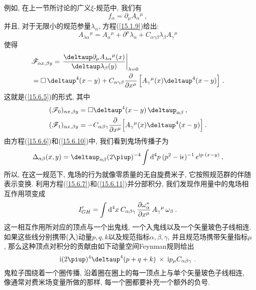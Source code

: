 例如, 在上一节所讨论的广义$\xi $-规范中, 我们有
\begin{equation}
f_{\alpha }=\partial _{\mu }A_{\alpha}{}^{\mu}\:,   \label{15.6.8}
\end{equation}%
并且, 对于无限小的规范参量$\lambda _{\alpha }$, 方程(\ref{15.1.9})给出:%
\[
A_{\lambda \alpha}{}^{\mu}=A_{\alpha}{}^{\mu}+\partial^{\mu }\lambda
_{\alpha }+C_{\alpha \gamma \beta }\lambda_{\beta}A_{\gamma}{}^{\mu}
\]%
使得\begin{align}
&\mathscr{F}_{\alpha x,\beta y} =\left. \frac{\deltaup \partial _{\mu
}A_{\lambda \alpha}{}^{\mu}(x)}{\deltaup \lambda _{\beta }(y)}\right\vert
_{\lambda =0}  \nonumber \\
&=\square \,\deltaup^{4}(x-y)+C_{\alpha \gamma \beta }\frac{\partial }{%
\partial x^{\mu }}\,\Big[ A_{\gamma}{}^{\mu}(x)\deltaup^{4}(x-y)\Big] \text{
.}  \label{15.6.9}
\end{align}
这就是(\ref{15.6.5})的形式, 其中\begin{align}
(\mathscr{F}_{0})_{\alpha x,\beta y} &=\square \deltaup^{4}(x-y)\,\deltaup
_{\alpha \beta }\:,   \label{15.6.10} \\
(\mathscr{F}_{1})_{\alpha x,\beta y} &=-C_{\alpha \beta \gamma }\frac{%
\partial }{\partial x^{\mu }}\Big[ A_{\gamma}{}^{\mu}(x)\deltaup^{4}(x-y)%
\Big] \:.   \label{15.6.11}
\end{align}%
由方程(\ref{15.6.6})和(\ref{15.6.10})中, 我们看到鬼场传播子为
\begin{equation}
\Delta _{\alpha \beta }(x,y)=\deltaup_{\alpha \beta }(2\uppi )^{-4}\int
\dif^{4}p\:(p^{2}-\mi\epsilon )^{-1}\,e^{\mi p\cdot (x-y)}\:,   \label{15.6.12}
\end{equation}%
所以, 在这一规范下, 鬼场的行为就像零质量的无自旋费米子, 它按照规范群的伴随表示变换. 
利用方程(\ref{15.6.7})和(\ref{15.6.11})并分部积分, 我们发现作用量中的鬼场相互作用项变成
\begin{equation}
I_{GH}^{\prime }=\int \dif^{4}x\:C_{\alpha \beta \gamma }\,\frac{\partial \omega
_{\alpha }^{\ast }}{\partial x^{\mu }}\,A_{\gamma}{}^{\mu }\,\omega _{\beta }%
\:.   \label{15.6.13}
\end{equation}%
这一相互作用所对应的顶点与一个出鬼线, 一个入鬼线以及一个矢量玻色子线相连. 如果这些线分别携带(入)动量$p,q,k$以及规范指标$\alpha ,\beta ,\gamma $, 并且规范场携带矢量指标$\mu $, 那么这种顶点对积分的贡献由如下动量空间Feynman规则给出
\begin{equation}
\mi(2\uppi )^{4}\deltaup^{4}(p+q+k)\:\times \:\mi p_{\mu }C_{\alpha \beta \gamma }\text{
.}  \label{15.6.14}
\end{equation}%
鬼粒子围绕着一个圈传播, 沿着圈在圈上的每一顶点上与单个矢量玻色子线相连, 像通常对费米场变量所做的那样, 
每一个圈都要补充一个额外的负号.

